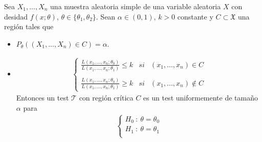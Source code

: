 \begin{lema}
    Sea $X_1,...,X_n$ una muestra aleatoria simple de una variable aleatoria $X$ con desidad $f(x;\theta)$, $\theta \in \{\theta_1,\theta_2\}$. Sean $\alpha \in (0,1)$, $k >0$ constante y $C \subset \mathfrak{X}$ una región tales que
    \begin{itemize}
        \item $P_{\theta}((X_1,...,X_n) \in C) = \alpha$.
        \item
              \begin{align*}
                  \left\{ \begin{array}{lcc}
                              \frac{L(x_1,...,x_n;\theta_0)}{L(x_1,...,x_n;\theta_1)} \leq k & si & (x_1,...,x_n) \in C \\
                              \\  \frac{L(x_1,...,x_n;\theta_0)}{L(x_1,...,x_n;\theta_1)} \ge k & si & (x_1,...,x_n) \not \in C
                          \end{array}
                  \right.
              \end{align*}
              Entonces un test $\mathcal{T}$ con región crítica $C$ es un test uniformemente de tamaño $\alpha$ para
              \begin{align*}
                  \left\{ \begin{array}{lcc}
                              H_0 \ : \ \theta = \theta_0 \\
                              H_1 \ : \ \theta = \theta_1 \\
                          \end{array}
                  \right.
              \end{align*}
    \end{itemize}
\end{lema}